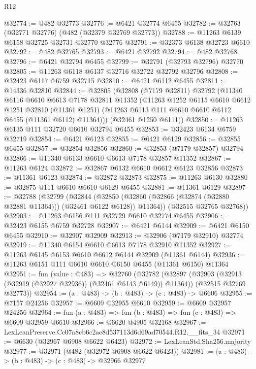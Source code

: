 \begin{lexlean}{R12}
\begin{coremodule}
@32774 := @482 @32773
@32776 := @6421 @32774 @6455
@32782 := @32763 (@32771 @32776) (@482 (@32379 @32769 @32773))
@32788 := @11263 @6139 @6158 @32725 @32731 @32770 @32776
@32791 := @32373 @6138 @32723 @6610
@32792 := @482 @32765
@32793 := @6421 @32792
@32794 := @482 @32768
@32796 := @6421 @32794 @6455
@32799 := @32791 (@32793 @32796) @32770
@32805 := @11263 @6118 @6137 @32716 @32722 @32792 @32796
@32808 := @32423 @6117 @6759 @32715
@32810 := @6421 @6112 @6455
@32811 := @14336 @32810
@32844 := @32805
    (@32808
      (@7179 @32811)
      @32792
      (@11340
        @6116
        @6610
        @6613
        @7178
        @32811
        @11352
        (@11263
          @1252
          @6115
          @6610
          @6612
          @1251
          @32810
          (@11361 @1251)
          (@11263 @6113 @111 @6610 @6610 @6112 @6455 (@11361 @6112) @11364)))
      (@32461 @1250 @6111))
@32850 := @11263 @6135 @111 @32720 @6610 @32794 @6455
@32853 := @32423 @6134 @6759 @32719
@32854 := @6421 @6123
@32855 := @6421 @6129
@32856 := @32855 @6455
@32857 := @32854 @32856
@32860 := @32853 (@7179 @32857) @32794
@32866 := @11340 @6133 @6610 @6613 @7178 @32857 @11352
@32867 := @11263 @6124
@32872 := @32867 @6132 @6610 @6612 @6123 @32856
@32873 := @11361 @6123
@32874 := @32872 @32873
@32875 := @11263 @6130
@32880 := @32875 @111 @6610 @6610 @6129 @6455
@32881 := @11361 @6129
@32897 := @32788
    (@32799
      (@32844
        (@32850 (@32860 (@32866 (@32874 (@32880 @32881 @11364))) (@32461 @6122 @6128)) @11364))
      (@32515 @32765 @32768))
@32903 := @11263 @6156 @111 @32729 @6610 @32774 @6455
@32906 := @32423 @6155 @6759 @32728
@32907 := @6421 @6144
@32909 := @6421 @6150 @6455
@32910 := @32907 @32909
@32913 := @32906 (@7179 @32910) @32774
@32919 := @11340 @6154 @6610 @6613 @7178 @32910 @11352
@32927 := @11263 @6145 @6153 @6610 @6612 @6144 @32909 (@11361 @6144)
@32936 := @11263 @6151 @111 @6610 @6610 @6150 @6455 (@11361 @6150) @11364
@32951 := fun (value : @483) =>
  @32760
    (@32782
      (@32897 (@32903 (@32913 (@32919 (@32927 @32936)) (@32461 @6143 @6149)) @11364))
      (@32515 @32769 @32773))
@32954 := (a : @483) -> (b : @483) -> (c : @483) -> @6606
@32955 := @7157 @24256
@32957 := @6609 @32955 @6610
@32959 := @6609 @32957 @24256
@32964 := fun (a : @483) => fun (b : @483) => fun (c : @483) => @6609 @32959 @6610
@32966 := @6620 @4905 @32168
@32967 := LexLeanPreserve.Cc07a8cb6c2ac8d537113d6d69ad70544.R12.__fits_34
@32971 := @6630 (@32967 @6908 @6622 @6423)
@32972 := LexLeanStd.Sha256.majority
@32977 := @32971 (@482 (@32972 @6908 @6622 @6423))
@32981 := (a : @483) -> (b : @483) -> (c : @483) -> @32966 @32977

\end{coremodule}
\end{lexlean}
